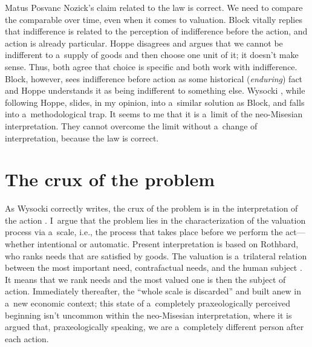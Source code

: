 \begin{artengenv}{Matus Posvanc}
Nozick's claim related to the law is correct. We need to compare the comparable over time, even when it comes to valuation. Block 
\parencites*[][]{Block1980On}[][]{Block2009Rejoinder} %
 vitally replies that indifference is related to the perception of indifference before the action, and action is already particular. Hoppe 
\parencite*[][]{Hoppe2005Must} %
 disagrees and argues that we cannot be indifferent to a~supply of goods and then choose one unit of it; it doesn't make sense. Thus, both agree that choice is specific and both work with indifference. Block, however, sees indifference before action as some historical (\textit{enduring}) fact and Hoppe understands it as being indifferent to something else. Wysocki 
\parencite*[][]{Wysocki2021problem}, %
 while following Hoppe, slides, in my opinion, into a~similar solution as Block, and falls into a~methodological trap. It seems to me that it is a~limit of the neo-Misesian interpretation. They cannot overcome the limit without a~change of interpretation, because the law is correct.



\section{The crux of the problem}



As Wysocki 
\parencite[][footnote 30]{Wysocki2021problem} %
 correctly writes, the crux of the problem is in the interpretation of the action 
\parencite[see also][]{Hudik2011note}. %
 I~argue that the problem lies in the characterization of the valuation process via a~scale, i.e., the process that takes place before we perform the act---whether intentional or automatic. Present interpretation is based on Rothbard, 
\parencite[][pp.5–6]{Rothbard2009Man} %
 who ranks needs that are satisfied by goods. The valuation is a~trilateral relation between the most important need, contrafactual needs, and the human subject 
\parencite[][]{Bilo2004Theory}. %
 It means that we rank needs and the most valued one is then the subject of action. Immediately thereafter, the ``whole scale is discarded'' and built anew in a~new economic context; this state of a~completely praxeologically perceived beginning isn't uncommon within the neo-Misesian interpretation, where it is argued that, praxeologically speaking, we are a~completely different person after each action.




\end{artengenv}
